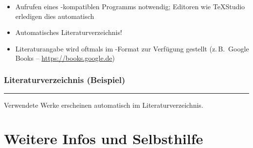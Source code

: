 \begin{frame}[<+->]
	\begin{itemize}
		\item Aufrufen eines -kompatiblen Programms notwendig; Editoren wie TeXStudio erledigen dies automatisch
		\item Automatisches Literaturverzeichnis!
		\item Literaturangabe wird oftmals im -Format zur Verfügung gestellt (z.\,B.\ Google Books – \url{https://books.google.de})
	\end{itemize}
	
\end{frame}

\begin{frame}[<+->]
	\frametitle{Literaturverzeichnis (Beispiel)}
	\nocite{sakurai2014modern}
	\printbibliography
	
	\hrule\bigskip
	
	Verwendete Werke erscheinen automatisch im Literaturverzeichnis.
\end{frame}

\section{Weitere Infos und Selbsthilfe}

